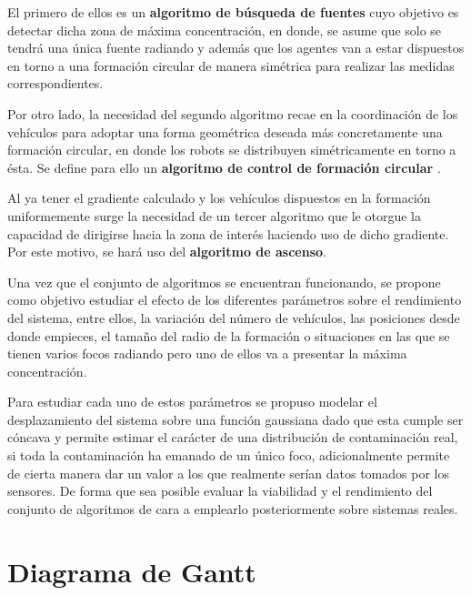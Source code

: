 El primero de ellos es un \textbf{algoritmo de búsqueda de fuentes} \cite{Estimacion_Gradiente} cuyo objetivo es detectar dicha zona de máxima concentración, en donde, se asume que solo se tendrá una única fuente radiando y además que los agentes van a estar dispuestos en torno a una formación circular de manera simétrica para realizar las medidas correspondientes. 

Por otro lado, la necesidad del segundo algoritmo recae en la coordinación de los vehículos para adoptar una forma geométrica deseada más concretamente una formación circular, en donde los robots se distribuyen simétricamente en torno a ésta. Se define para ello un \textbf{algoritmo de control de formación circular} \cite{Control_Formacion}.

Al ya tener el gradiente calculado y los vehículos dispuestos en la formación uniformemente surge la necesidad de un tercer algoritmo que le otorgue la capacidad de dirigirse hacia la zona de interés haciendo uso de dicho gradiente. Por este motivo, se hará uso del \textbf{algoritmo de ascenso}.

Una vez que el conjunto de algoritmos se encuentran funcionando, se propone como objetivo estudiar el efecto de los diferentes parámetros sobre el rendimiento del sistema, entre ellos, la variación del número de vehículos, las posiciones desde donde empieces, el tamaño del radio de la formación o situaciones en las que se tienen varios focos radiando pero uno de ellos va a presentar la máxima concentración.

Para estudiar cada uno de estos parámetros se propuso modelar el desplazamiento del sistema sobre una función gaussiana dado que esta cumple ser cóncava y permite estimar el carácter de una distribución de contaminación real, si toda la contaminación ha emanado de un único foco, adicionalmente permite de cierta manera dar un valor a los que realmente serían datos tomados por los sensores. De forma que sea posible evaluar la viabilidad y el rendimiento del conjunto de algoritmos de cara a emplearlo posteriormente sobre sistemas reales.

\section{Diagrama de Gantt}\label{Gantt}

